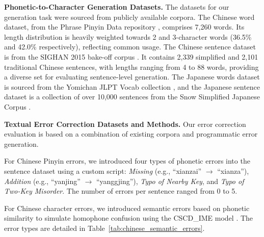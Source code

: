 \documentclass[10pt, a4paper]{article}
\begin{document}
\textbf{Phonetic-to-Character Generation Datasets.}
The datasets for our generation task were sourced from publicly available corpora. The {Chinese word dataset}, from the Phrase Pinyin Data repository \citep{phrase-pinyin-data}, comprises 7,260 words. Its length distribution is heavily weighted towards 2 and 3-character words (36.5\% and 42.0\% respectively), reflecting common usage. The {Chinese sentence dataset} is from the SIGHAN 2015 bake-off corpus \citep{tseng2015introduction}. It contains 2,339 simplified and 2,101 traditional Chinese sentences, with lengths ranging from 4 to 88 words, providing a diverse set for evaluating sentence-level generation. The {Japanese words dataset} is sourced from the Yomichan JLPT Vocab collection \citep{stephenmk2024yomichan}, and the {Japanese sentence dataset} is a collection of over 10,000 sentences from the Snow Simplified Japanese Corpus \citep{snow2024simplified}.

\textbf{Textual Error Correction Datasets and Methods.}
Our error correction evaluation is based on a combination of existing corpora and programmatic error generation.

{For Chinese Pinyin errors,} we introduced four types of phonetic errors into the sentence dataset using a custom script: \textit{Missing} (e.g., ``xianzai'' $\to$ ``xianza''), \textit{Addition} (e.g., ``yanjing'' $\to$ ``yanggjing''), \textit{Typo of Nearby Key}, and \textit{Typo of Two-Key Misorder}. The number of errors per sentence ranged from 0 to 5. 

{For Chinese character errors,} we introduced semantic errors based on phonetic similarity to simulate homophone confusion using the CSCD\_IME model \citep{nghuyong2024cscdime}. The error types are detailed in Table~\ref{tab:chinese_semantic_errors}.
\end{document}
